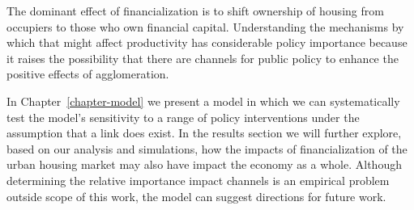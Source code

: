 The dominant effect of financialization is to shift ownership of housing from occupiers to those who own financial capital. Understanding the mechanisms by which that might affect productivity has considerable policy importance because it raises the possibility that there are channels for public policy to enhance the positive effects of agglomeration. 

In  Chapter~\ref{chapter-model} we present a model in which we can systematically test the model's sensitivity to a range of policy interventions under the assumption that a link does exist. %
In the results section we will further explore, based on our analysis and simulations, how the %
impacts of financialization of the urban housing market may also have impact %
the economy as a whole. Although determining the relative importance impact channels %
is an empirical problem outside scope of this work, %
the model can suggest directions for future work.









